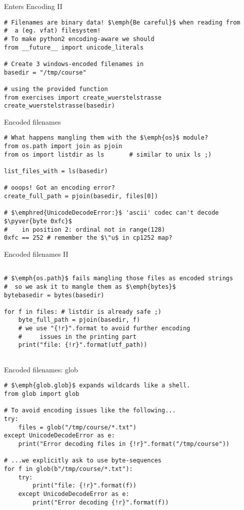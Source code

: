 \begin{frame}[fragile]{Enters Encoding II}
\begin{verbatim}
# Filenames are binary data! $\emph{Be careful}$ when reading from
#  a (eg. vfat) filesystem!
# To make python2 encoding-aware we should
from __future__ import unicode_literals

# Create 3 windows-encoded filenames in 
basedir = "/tmp/course"

# using the provided function
from exercises import create_wuerstelstrasse
create_wuerstelstrasse(basedir)
\end{verbatim}
\end{frame}



\begin{frame}[fragile]{Encoded filenames}
\begin{verbatim}
# What happens mangling them with the $\emph{os}$ module?
from os.path import join as pjoin
from os import listdir as ls       # similar to unix ls ;)

list_files_with = ls(basedir)

# ooops! Got an encoding error?
create_full_path = pjoin(basedir, files[0])

# $\emphred{UnicodeDecodeError:}$ 'ascii' codec can't decode $\pyver{byte 0xfc}$
#    in position 2: ordinal not in range(128)
0xfc == 252 # remember the $\"u$ in cp1252 map? 
\end{verbatim}
\end{frame}

\begin{frame}[fragile]{Encoded filenames II}
\begin{verbatim}

# $\emph{os.path}$ fails mangling those files as encoded strings
#  so we ask it to mangle them as $\emph{bytes}$
bytebasedir = bytes(basedir)

for f in files: # listdir is already safe ;)
    byte_full_path = pjoin(basedir, f)
    # we use "{!r}".format to avoid further encoding
    #     issues in the printing part
    print("file: {!r}".format(utf_path))
    
\end{verbatim}
\end{frame}

\begin{frame}[fragile]{Encoded filenames: glob}
\begin{verbatim}
# $\emph{glob.glob}$ expands wildcards like a shell. 
from glob import glob

# To avoid encoding issues like the following...
try:
    files = glob("/tmp/course/*.txt")
except UnicodeDecodeError as e:
    print("Error decoding files in {!r}".format("/tmp/course"))

# ...we explicitly ask to use byte-sequences
for f in glob(b"/tmp/course/*.txt"):
    try:
        print("file: {!r}".format(f))
    except UnicodeDecodeError as e:
        print("Error decoding {!r}".format(f))

\end{verbatim}
\end{frame}


